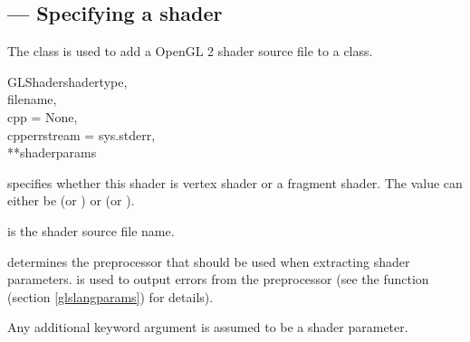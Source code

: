 \subsection{ --- Specifying a shader}

The  class is used to add a OpenGL 2 shader source file
to a  class.

\begin{classdesc}{GLShader}{shadertype,\\
                            filename,\\ 
                            cpp = None,\\
                            cpperrstream = sys.stderr,\\
                            **shaderparams
                            }

 specifies whether this shader is vertex shader or a
fragment shader. The value can either be 
(or ) or 
(or ).

 is the shader source file name.

 determines the preprocessor that should be used when extracting
shader parameters.  is used to output errors from the
preprocessor (see the function  
(section \ref{glslangparams}) for details).

Any additional keyword argument is assumed to be a shader parameter.
\end{classdesc}

